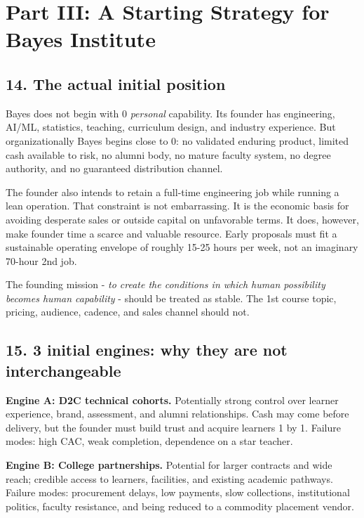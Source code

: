 
\section*{Part III: A Starting Strategy for Bayes Institute}

\subsection{14. The actual initial position}

Bayes does not begin with 0 \textit{personal} capability. Its founder has engineering, AI/\allowbreak ML, statistics, teaching, curriculum design, and industry experience. But organizationally Bayes begins close to 0: no validated enduring product, limited cash available to risk, no alumni body, no mature faculty system, no degree authority, and no guaranteed distribution channel.

The founder also intends to retain a full-time engineering job while running a lean operation. That constraint is not embarrassing. It is the economic basis for avoiding desperate sales or outside capital on unfavorable terms. It does, however, make founder time a scarce and valuable resource. Early proposals must fit a sustainable operating envelope of roughly 15-25 hours per week, not an imaginary 70-hour 2nd job.

The founding mission - \textit{to create the conditions in which human possibility becomes human capability} - should be treated as stable. The 1st course topic, pricing, audience, cadence, and sales channel should not.

\subsection{15. 3 initial engines: why they are not interchangeable}

\textbf{Engine A: D2C technical cohorts.} Potentially strong control over learner experience, brand, assessment, and alumni relationships. Cash may come before delivery, but the founder must build trust and acquire learners 1 by 1. Failure modes: high CAC, weak completion, dependence on a star teacher.

\textbf{Engine B: College partnerships.} Potential for larger contracts and wide reach; credible access to learners, facilities, and existing academic pathways. Failure modes: procurement delays, low payments, slow collections, institutional politics, faculty resistance, and being reduced to a commodity placement vendor.

